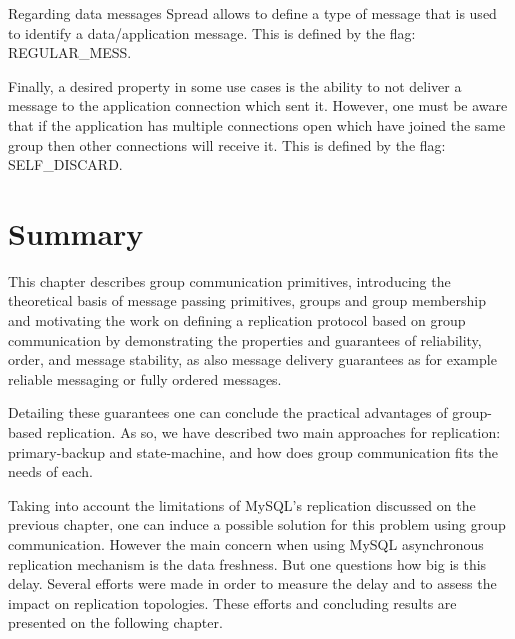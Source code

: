 Regarding data messages Spread allows to define a type of message that is used to identify a data/application message. This is defined by the flag: REGULAR\_MESS.

Finally, a desired property in some use cases is the ability to not deliver a message to the application connection which sent it. However, one must be aware that if the application has multiple connections open which have joined the same group then other connections will receive it. This is defined by the flag: SELF\_DISCARD.

\section{Summary}

This chapter describes group communication primitives, introducing the theoretical basis of message passing primitives, groups and group membership and motivating the work on defining a replication protocol based on group communication by demonstrating the properties and guarantees of reliability, order, and message stability, as also message delivery guarantees as for example reliable messaging or fully ordered messages.

Detailing these guarantees one can conclude the practical advantages of group-based replication. As so, we have described two main approaches for replication: primary-backup and state-machine, and how does group communication fits the needs of each.

Taking into account the limitations of MySQL's replication discussed on the previous chapter, one can induce a possible solution for this problem using group communication. However the main concern when using MySQL asynchronous replication mechanism is the data freshness. But one questions how big is this delay. Several efforts were made in order to measure the delay and to assess the impact on replication topologies. These efforts and concluding results are presented on the following chapter.

